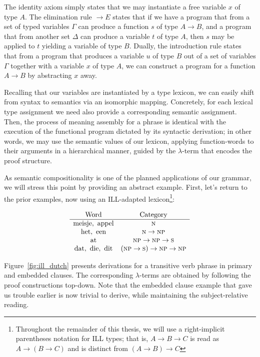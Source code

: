 The identity axiom simply states that we may instantiate a free variable $x$ of type $A$.
The elimination rule $\rightarrow E$ states that if we have a program that from a set of typed variables $\Gamma$ can produce a function $s$ of type $A \to B$, and a program that from another set $\Delta$ can produce a variable $t$ of type $A$, then $s$ may be applied to $t$ yielding a variable of type $B$.
Dually, the introduction rule states that from a program that produces a variable $u$ of type $B$ out of a set of variables $\Gamma$ together with a variable $x$ of type $A$, we can construct a program for a function $A\to B$ by abstracting $x$ away.

Recalling that our variables are instantiated by a type lexicon, we can easily shift from syntax to semantics via an isomorphic mapping.
Concretely, for each lexical type assignment we need also provide a corresponding semantic assignment.
Then, the process of meaning assembly for a phrase is identical with the execution of the functional program dictated by its syntactic derivation; in other words, we may use the semantic values of our lexicon, applying function-words to their arguments in a hierarchical manner, guided by the $\lambda$-term that encodes the proof structure.

As semantic compositionality is one of the planned applications of our grammar, we will stress this point by providing an abstract example.
First, let's return to the prior examples, now using an ILL-adapted lexicon\footnote{Throughout the remainder of this thesis, we will use a right-implicit parentheses notation for ILL types; that is, $A\to B \to C$ is read as $A\to (B \to C)$ and is distinct from $(A\to B) \to C$}:

 \[
 \begin{array}{cc}
 \text{Word} & \text{Category} \\
 \hline
 \text{meisje}, \ \text{appel} & \textsc{n} \\
 \text{het}, \ \text{een}  & \textsc{n} \to \textsc{np}\\
 \text{at}  & \textsc{np} \to \textsc{np} \to \textsc{s}\\ 
 \text{dat}, \ \text{die}, \ \text{dit} & (\textsc{np}\to \textsc{s})\to \textsc{np} \to \textsc{np} \\
 \end{array}
 \]

Figure~\ref{fig:ill_dutch} presents derivations for a transitive verb phrase in primary and embedded clauses.
The corresponding $\lambda$-terms are obtained by following the proof constructions top-down.
Note that the embedded clause example that gave us trouble earlier is now trivial to derive, while maintaining the subject-relative reading.


